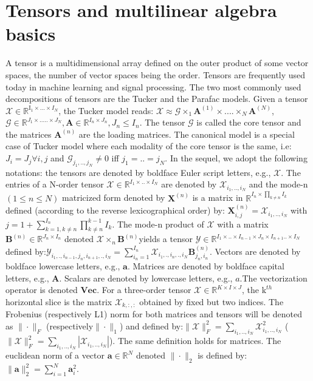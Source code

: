 \documentclass{article}
\def\tX{\boldsymbol{{\mathscr X}}}
\def\tY{\boldsymbol{{\mathscr Y}}}
\def\tG{\boldsymbol{{\mathscr G}}}
\def\A{{\mathbf A}}
\def\B{{\mathbf B}}
\def\X{{\mathbf X}}
\begin{document}
\section{Tensors and multilinear algebra basics}
A tensor is a multidimensional array defined on the outer product of some vector spaces, the number of vector spaces being the order. Tensors are frequently used today in machine learning and signal processing. The two most commonly used decompositions of tensors are the Tucker and the Parafac models. Given a tensor $\tX\in \mathbb{R}^{\text{I}_{1}\times...\times I_{N}}$, the Tucker model reads:
$\tX \approx \tG \times_{1}\A^{(1)}\times....\times_{N}\A^{(N)}$, $\tG \in \mathbb{R}^{J_{1}\times.....\times J_{N}},\A \in \mathbb{R}^{I_{n}\times J_{n}},J_{n}\leq I_{n}$. The tensor $\tG$ is called the core tensor and the matrices $\A^{(n)}$ are the loading matrices. The canonical model is a special case of Tucker model where each modality of the core tensor is the same, i.e: $J_{i}=J_{j}\forall i,j$ and $\tG_{j_{1},..,j_{N}}\neq 0 $ iff $j_{1}=..=j_{N}$.
In the sequel, we adopt the following notations: the tensors  are denoted by boldface Euler script letters, e.g., $\tX$. The entries of a N-order tensor $\tX\in\mathbb{R}^{I_{1}\times..\times I_{N}}$ are denoted by $\tX_{i_{1},..,i_{N}}$ and the mode-n $(1\leq n\leq N)$ matricized form denoted by $\X^{(n)}$ is a matrix in $\mathbb{R}^{I_{n}\times \prod_{k\neq n}I_{k}}$ defined (according to the reverse lexicographical order) by: $\X^{(n)}_{i,j}=\tX_{i_{1},..,i_{N}}$ with $j=1+\sum^{I_{n}}_{k=1,k\neq n}\prod^{k-1}_{k\neq n}I_{k}$. The mode-n product of $\tX$ with a matrix $\B^{(n)}\in\mathbb{R}^{J_{n}\times I_{n}}$ denoted $\tX\times_{n}\B^{(n)}$yields a tensor $\tY\in \mathbb{R}^{I_{1}\times..\times I_{n-1}\times J_{n}\times I_{n+1}..\times I_{N}}$ defined by:$\tY_{i_{1},.,i_{n-1},j_{n},i_{n+1},.,i_{N}}=\sum^{I_{n}}_{i_{n}=1}\tX_{i_{1},.,i_{n},.,i_{N}}\B^{(n)}_{j_{n},i_{n}}$. Vectors are denoted by boldface lowercase letters, e.g., $\mathbf{a}$. Matrices are denoted by boldface capital letters, e.g., $\A$. Scalars are denoted by lowercase letters, e.g., $a$.The vectorization operator is denoted  $\textbf{Vec}$. For a three-order tensor $\tX \in \mathbb{R}^{K\times I\times J}$, the $\text{k}^{th}$ horizontal slice is the matrix $\tX_{k,:,:}$ obtained by fixed but two indices.
The Frobenius (respectively L1) norm for both matrices and tensors will be denoted as $\|\cdot\|_{F}$ (respectively$\|\cdot\|_{1}$) and defined by:$\|\tX\|^{2}_{F}=\sum_{i_{1},..,i_{N}}\tX^{2}_{i_{1},..,i_{N}}$ ($\|\tX\|^{2}_{F}=\sum_{i_{1},..,i_{N}}|\tX_{i_{1},..,i_{N}}|$). The same  definition holds for matrices. The euclidean norm of a vector $\mathbf{a}\in \mathbb{R}^{N}$ denoted $\|\cdot\|_{2}$ is defined by: $\|\mathbf{a}\|^{2}_{2}=\sum^{N}_{i=1}\mathbf{a}^{2}_{i}$.
\end{document}
